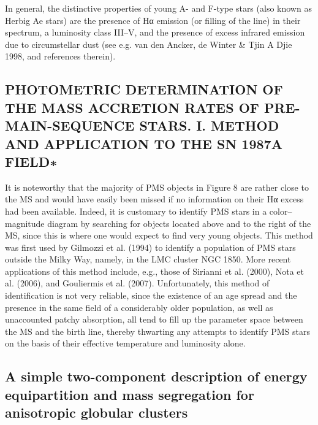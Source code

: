 \documentclass[../Main.tex]{subfiles}
\begin{document}
{In general, the distinctive properties of young A- and F-type stars
(also known as Herbig Ae stars) are the presence of Hα emission (or
filling of the line) in their spectrum, a luminosity class III–V, and the
presence of excess infrared emission due to circumstellar dust (see
e.g. van den Ancker, de Winter & Tjin A Djie 1998, and references
therein).

\subsection{PHOTOMETRIC DETERMINATION OF THE MASS ACCRETION RATES OF PRE-MAIN-SEQUENCE STARS. I.
METHOD AND APPLICATION TO THE SN 1987A FIELD∗}
It is noteworthy that the majority of PMS objects in Figure 8
are rather close to the MS and would have easily been missed if
no information on their Hα excess had been available. Indeed, it
is customary to identify PMS stars in a color–magnitude diagram
by searching for objects located above and to the right of the MS,
since this is where one would expect to find very young objects.
This method was first used by Gilmozzi et al. (1994) to identify
a population of PMS stars outside the Milky Way, namely, in
the LMC cluster NGC 1850. More recent applications of this
method include, e.g., those of Sirianni et al. (2000), Nota et al.
(2006), and Gouliermis et al. (2007).
Unfortunately, this method of identification is not very
reliable, since the existence of an age spread and the presence in the same field of a considerably older population, as well as
unaccounted patchy absorption, all tend to fill up the parameter
space between the MS and the birth line, thereby thwarting any
attempts to identify PMS stars on the basis of their effective
temperature and luminosity alone.

\subsection{A simple two-component description of energy equipartition and
mass segregation for anisotropic globular clusters}


}
\end{document}
